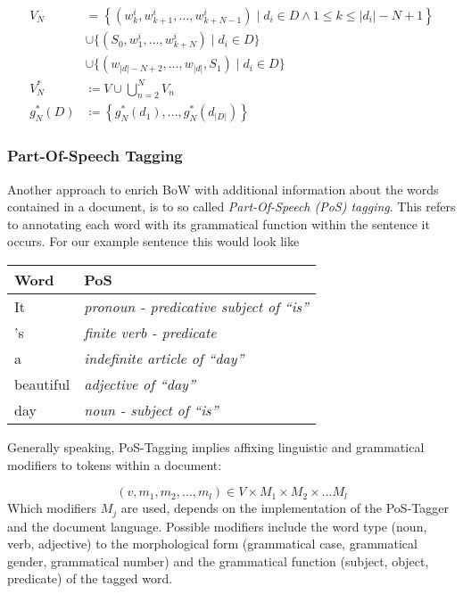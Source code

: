 \begin{equation*}
\begin{split}
	V_N &=  \left \{(w_k^i,
	w_{k+1}^i,\ldots,w_{k+N-1}^i) \mid d_i \in D \wedge 1 \leq k \leq |d_i|-N+1
	\right\} \\
	& \cup \{ (S_0,w_1^i,\ldots,w_{k+N}^i)  \mid d_i \in D \} \\
	& \cup \{ (w_{|d|-N+2},\ldots,w_{|d|},S_1) \mid d_i \in D\} \\
	V_N^* &\coloneqq V \cup \bigcup\limits_{n=2}^N  V_n \\
	g_N^*(D) &\coloneqq \left\{g_N^*(d_1),\ldots,g_N^*(d_{|D|})\right\}
\end{split}
\end{equation*}

\subsubsection{Part-Of-Speech Tagging}
Another approach to enrich BoW with additional information about the words
contained in a document, is to so called \emph{Part-Of-Speech (PoS) tagging}.
This refers to annotating each word with its grammatical function within the sentence it occurs. 
For our example sentence this would look like

\begin{center}
\begin{tabular}{|l|l|}
\hline
\textbf{Word} & \textbf{PoS} \\
\hline 
It 		  & \emph{pronoun - predicative subject of ``is''} \\
's 		  & \emph{finite verb - predicate} \\ 
a 		  & \emph{indefinite article of ``day''}  \\
beautiful & \emph{adjective of ``day''} \\
day		  & \emph{noun - subject of ``is''} \\
\hline
\end{tabular}
\end{center}

Generally speaking, PoS-Tagging implies affixing linguistic and
grammatical modifiers to tokens within a document: 

\begin{equation*}
(v,m_1,m_2,\ldots,m_l) \in
V \times M_1 \times M_2 \times \ldots M_l
\end{equation*}
Which modifiers $M_j$ are used, depends on the implementation of the
PoS-Tagger and the document language. Possible modifiers include the word
type (noun, verb, adjective) to the morphological form (grammatical case,
grammatical gender, grammatical number) and the grammatical function 
(subject, object, predicate) of the tagged word.
 
